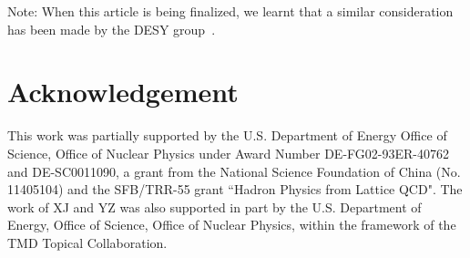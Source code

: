 \documentclass[prd,aps,twocolumn,preprintnumbers, showpacs, nofootinbib,superscriptaddress,notitlepage]{revtex4-1}
\begin{document}
Note: When this article is being finalized, we learnt that a similar consideration has been made by the DESY group~\cite{greentalk}.


\section*{Acknowledgement}
This work was partially supported by the U.S. Department of Energy Office of Science, Office of Nuclear Physics under Award Number DE-FG02-93ER-40762 and DE-SC0011090, a grant from the National Science Foundation of China (No. 11405104) and the SFB/TRR-55 grant ``Hadron Physics from Lattice QCD". The work of XJ and YZ was also supported in part by the U.S. Department of Energy, Office of Science, Office of Nuclear Physics, within the framework of the TMD Topical Collaboration.
\end{document}
